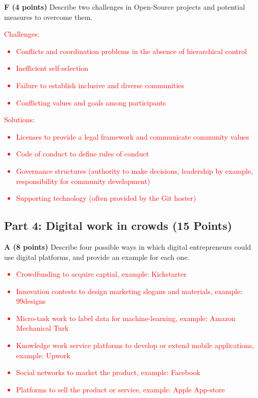 \documentclass[12pt]{scrartcl}
\begin{document}
\newpage

\textbf{F (4 points)} Describe two challenges in Open-Source projects and potential measures to overcome them.

\textcolor{red}{
	Challenges:
	\begin{itemize}
		\item Conflicts and coordination problems in the absence of hierarchical control
		\item Inefficient self-selection
		\item Failure to establish inclusive and diverse communities
		\item Conflicting values and goals among participants
	\end{itemize}
Solutions:
	\begin{itemize}
	\item Licenses to provide a legal framework and communicate community values
	\item Code of conduct to define rules of conduct
	\item Governance structures (authority to make decisions, leadership by example, responsibility for community development)
	\item Supporting technology (often provided by the Git hoster)	
\end{itemize}
}

\subsection*{Part 4: Digital work in crowds (15 Points)}

\textbf{A (8 points)} Describe four possible ways in which digital entrepreneurs could use digital platforms, and provide an example for each one.

\textcolor{red}{
	\begin{itemize}
		\item Crowdfunding to acquire captial, example: Kickstarter
		\item Innovation contests to design marketing slogans and materials, example: 99designs
		\item  Micro-task work to label data for machine-learning, example: Amazon Mechanical Turk
		\item Knowledge work service platforms to develop or extend mobile applications, example: Upwork
		\item Social networks to market the product, example: Facebook
		\item Platforms to sell the product or service, example: Apple App-store
	\end{itemize}
}
\end{document}
